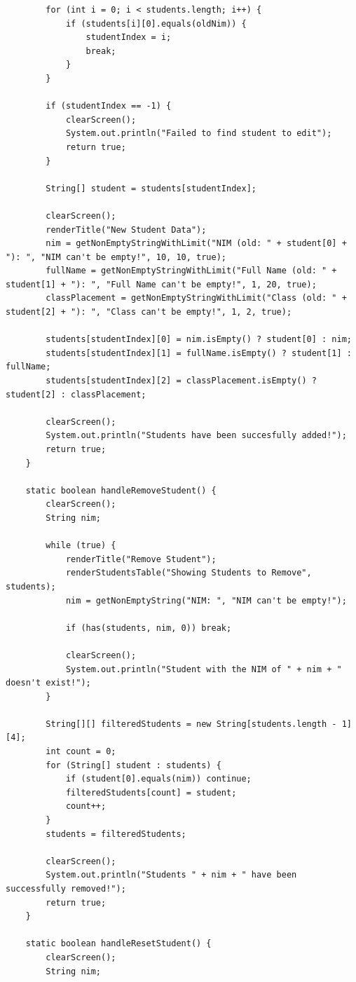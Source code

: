 \documentclass[12pt,titlepage]{article}
\begin{document}
\begin{verbatim}
        for (int i = 0; i < students.length; i++) {
            if (students[i][0].equals(oldNim)) {
                studentIndex = i;
                break;
            }
        }

        if (studentIndex == -1) {
            clearScreen();
            System.out.println("Failed to find student to edit");
            return true;
        }

        String[] student = students[studentIndex];

        clearScreen();
        renderTitle("New Student Data");
        nim = getNonEmptyStringWithLimit("NIM (old: " + student[0] + "): ", "NIM can't be empty!", 10, 10, true);
        fullName = getNonEmptyStringWithLimit("Full Name (old: " + student[1] + "): ", "Full Name can't be empty!", 1, 20, true);
        classPlacement = getNonEmptyStringWithLimit("Class (old: " + student[2] + "): ", "Class can't be empty!", 1, 2, true);

        students[studentIndex][0] = nim.isEmpty() ? student[0] : nim;
        students[studentIndex][1] = fullName.isEmpty() ? student[1] : fullName;
        students[studentIndex][2] = classPlacement.isEmpty() ? student[2] : classPlacement;

        clearScreen();
        System.out.println("Students have been succesfully added!");
        return true;
    }

    static boolean handleRemoveStudent() {
        clearScreen();
        String nim;

        while (true) {
            renderTitle("Remove Student");
            renderStudentsTable("Showing Students to Remove", students);
            nim = getNonEmptyString("NIM: ", "NIM can't be empty!");

            if (has(students, nim, 0)) break;

            clearScreen();
            System.out.println("Student with the NIM of " + nim + " doesn't exist!");
        }

        String[][] filteredStudents = new String[students.length - 1][4];
        int count = 0;
        for (String[] student : students) {
            if (student[0].equals(nim)) continue;
            filteredStudents[count] = student;
            count++;
        }
        students = filteredStudents;

        clearScreen();
        System.out.println("Students " + nim + " have been successfully removed!");
        return true;
    }

    static boolean handleResetStudent() {
        clearScreen();
        String nim;



\end{verbatim}
\end{document}
